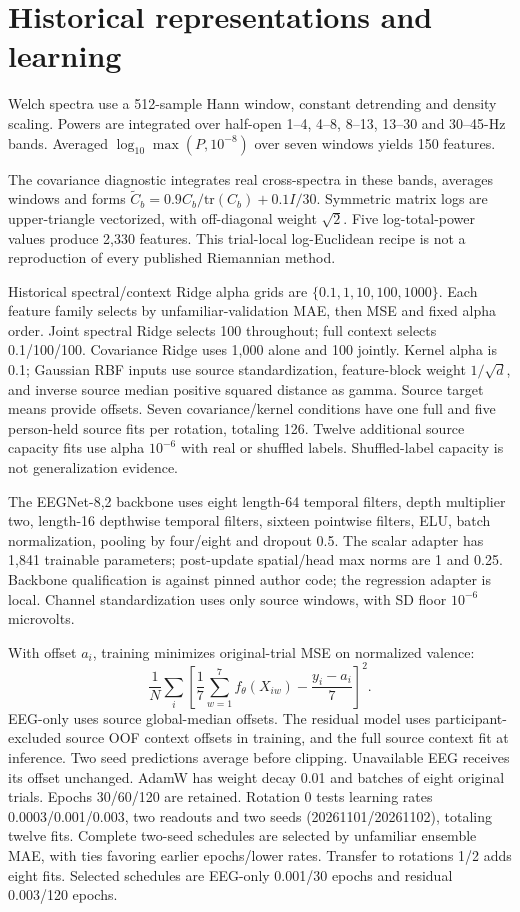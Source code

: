 \documentclass[10pt,a4paper]{article}
\begin{document}
\section{Historical representations and learning}
Welch spectra use a 512-sample Hann window, constant detrending and density scaling. Powers are integrated over half-open 1--4, 4--8, 8--13, 13--30 and 30--45-Hz bands. Averaged \(\log_{10}\max(P,10^{-8})\) over seven windows yields 150 features.

The covariance diagnostic integrates real cross-spectra in these bands, averages windows and forms \(\widetilde C_b=0.9C_b/\mathrm{tr}(C_b)+0.1I/30\). Symmetric matrix logs are upper-triangle vectorized, with off-diagonal weight \(\sqrt{2}\). Five log-total-power values produce 2,330 features. This trial-local log-Euclidean recipe is not a reproduction of every published Riemannian method.

Historical spectral/context Ridge alpha grids are \(\{0.1,1,10,100,1000\}\). Each feature family selects by unfamiliar-validation MAE, then MSE and fixed alpha order. Joint spectral Ridge selects 100 throughout; full context selects 0.1/100/100. Covariance Ridge uses 1,000 alone and 100 jointly. Kernel alpha is 0.1; Gaussian RBF inputs use source standardization, feature-block weight \(1/\sqrt d\), and inverse source median positive squared distance as gamma. Source target means provide offsets. Seven covariance/kernel conditions have one full and five person-held source fits per rotation, totaling 126. Twelve additional source capacity fits use alpha \(10^{-6}\) with real or shuffled labels. Shuffled-label capacity is not generalization evidence.

The EEGNet-8,2 backbone uses eight length-64 temporal filters, depth multiplier two, length-16 depthwise temporal filters, sixteen pointwise filters, ELU, batch normalization, pooling by four/eight and dropout 0.5. The scalar adapter has 1,841 trainable parameters; post-update spatial/head max norms are 1 and 0.25. Backbone qualification is against pinned author code; the regression adapter is local. Channel standardization uses only source windows, with SD floor \(10^{-6}\) microvolts.

With offset \(a_i\), training minimizes original-trial MSE on normalized valence:
\[
\frac{1}{N}\sum_i\left[\frac{1}{7}\sum_{w=1}^{7}f_\theta(X_{iw})-\frac{y_i-a_i}{7}\right]^2.
\]
EEG-only uses source global-median offsets. The residual model uses participant-excluded source OOF context offsets in training, and the full source context fit at inference. Two seed predictions average before clipping. Unavailable EEG receives its offset unchanged. AdamW has weight decay 0.01 and batches of eight original trials. Epochs 30/60/120 are retained. Rotation 0 tests learning rates 0.0003/0.001/0.003, two readouts and two seeds (20261101/20261102), totaling twelve fits. Complete two-seed schedules are selected by unfamiliar ensemble MAE, with ties favoring earlier epochs/lower rates. Transfer to rotations 1/2 adds eight fits. Selected schedules are EEG-only 0.001/30 epochs and residual 0.003/120 epochs.
\end{document}
